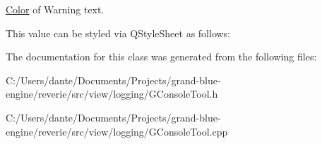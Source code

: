 \mbox{\hyperlink{classrev_1_1_color}{Color}} of Warning text. 

This value can be styled via Q\+Style\+Sheet as follows\+: 
\begin{DoxyCode}{0}
\end{DoxyCode}
 

The documentation for this class was generated from the following files\+:\begin{DoxyCompactItemize}
\item 
C\+:/\+Users/dante/\+Documents/\+Projects/grand-\/blue-\/engine/reverie/src/view/logging/G\+Console\+Tool.\+h\item 
C\+:/\+Users/dante/\+Documents/\+Projects/grand-\/blue-\/engine/reverie/src/view/logging/G\+Console\+Tool.\+cpp\end{DoxyCompactItemize}
